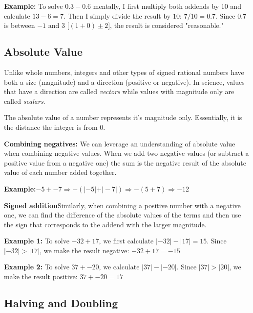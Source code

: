 \documentclass{article}
\begin{document}
	\bigskip
	
	\textbf{Example:} To solve $0.3-0.6$ mentally, I first multiply both addends by $10$ and calculate $13-6=7$. Then I simply divide the result by $10$: $7/10=0.7$. Since $0.7$ is between $-1$ and $3$ [$(1+0)\pm2$], the result is considered "reasonable."

\bigskip
\bigskip

\subsection{Absolute Value}

Unlike whole numbers, integers and other types of signed rational numbers have both a size (magnitude) and a direction (positive or negative). In science, values that have a direction are called \textit{vectors} while values with magnitude only are called \textit{scalars}.

The absolute value of a number represents it's magnitude only. Essentially, it is the distance the integer is from $0$.

	\textbf{Combining negatives:} We can leverage an understanding of absolute value when combining negative values. When we add two negative values (or subtract a positive value from a negative one) the sum is the negative result of  the absolute value of each number added together.


\bigskip

\textbf{Example:}$-5+-7\Rightarrow-(\lvert-5\rvert+\vert-7\rvert)\Rightarrow-(5+7)\Rightarrow-12$

\bigskip
\bigskip

\textbf{Signed addition}Similarly, when combining a positive number with a negative one, we can find the difference of the absolute values of the terms and then use the sign that corresponds to the addend with the larger magnitude.


\bigskip

\textbf{Example 1:} To solve $-32+17$, we first calculate $\lvert-32\rvert-\lvert17\rvert=15$. Since $\lvert-32\rvert>\lvert17\rvert$, we make the result negative: $-32+17=-15$ 

\bigskip

\textbf{Example 2:} To solve $37+-20$, we calculate $\lvert37\rvert-\lvert-20\rvert$. Since $\lvert37\rvert>\lvert20\rvert$, we make the result positive: $37+-20=17$

\bigskip
\bigskip
\subsection{Halving and Doubling}
\end{document}
